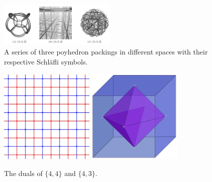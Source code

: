 \begin{multicols}{2}
\end{multicols}

\begin{figure}[h]
	\centering
	\includegraphics[width=0.5\textwidth]{Fig91}
	\caption{A series of three poyhedron packings in different spaces with their respective Schl\"{a}fli symbols.} 
\end{figure}

\begin{figure}[h]
	\centering
	\includegraphics[width=0.4\textwidth]{Fig101}
	\includegraphics[width=0.4\textwidth]{Fig102}
	\caption{The duals of \(\{4,4\}\) and \(\{4,3\}\).} 
\end{figure}

